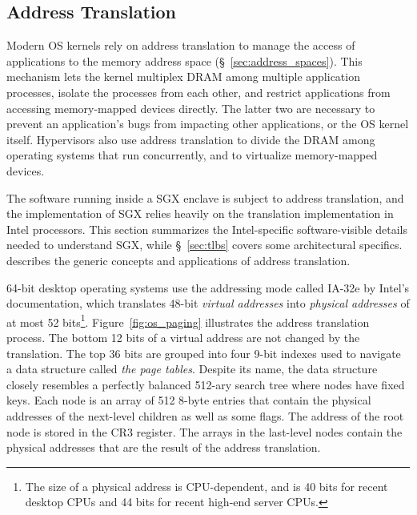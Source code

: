 \subsection{Address Translation}
\label{sec:paging}

Modern OS kernels rely on address translation to manage the access of
applications to the memory address space (\S~\ref{sec:address_spaces}). This
mechanism lets the kernel multiplex DRAM among multiple application processes,
isolate the processes from each other, and restrict applications from accessing
memory-mapped devices directly. The latter two are necessary to prevent an
application's bugs from impacting other applications, or the OS kernel itself.
Hypervisors also use address translation to divide the DRAM among operating
systems that run concurrently, and to virtualize memory-mapped devices.

The software running inside a SGX enclave is subject to address
translation, and the implementation of SGX relies heavily on the translation
implementation in Intel processors. This section summarizes the Intel-specific
software-visible details needed to understand SGX, while \S~\ref{sec:tlbs}
covers some architectural specifics. \cite{jacob1998virtual} describes the
generic concepts and applications of address translation.


64-bit desktop operating systems use the addressing mode called IA-32e by
Intel's documentation, which translates 48-bit \textit{virtual addresses} into
\textit{physical addresses} of at most 52 bits\footnote{The size of a physical
  address is CPU-dependent, and is 40 bits for recent desktop CPUs and 44 bits
for recent high-end server CPUs.}.  Figure~\ref{fig:os_paging} illustrates the
address translation process. The bottom 12 bits of a virtual address are not
changed by the translation. The top 36 bits are grouped into four 9-bit indexes
used to navigate a data structure called \textit{the page tables}. Despite its
name, the data structure closely resembles a perfectly balanced 512-ary search
tree where nodes have fixed keys.  Each node is an array of 512 8-byte entries
that contain the physical addresses of the next-level children as well as some
flags. The address of the root node is stored in the CR3 register. The arrays
in the last-level nodes contain the physical addresses that are the result of
the address translation.

